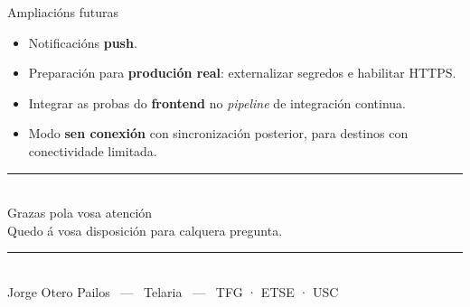 \documentclass[11pt,aspectratio=169]{beamer}
\begin{document}
\begin{frame}{Ampliacións futuras}
  \begin{itemize}
    \item Notificacións \textbf{push}.
    \item Preparación para \textbf{produción real}: externalizar segredos e habilitar HTTPS.
    \item Integrar as probas do \textbf{frontend} no \textit{pipeline} de integración continua.
    \item Modo \textbf{sen conexión} con sincronización posterior, para destinos con conectividade limitada.
  \end{itemize}
\end{frame}

\begin{frame}
  \vfill
  \begin{center}
    {\color{telPrimary}\rule{0.35\textwidth}{2pt}}\\[1.2em]
    {\color{telDeep} Grazas pola vosa atención}\\[1em]
    {\large\color{telInk} Quedo á vosa disposición para calquera pregunta.}\\[1.6em]
    {\color{telPrimary}\rule{0.35\textwidth}{2pt}}\\[1.4em]
    {\small\color{telGrey} Jorge Otero Pailos \ — \ Telaria \ — \ TFG · ETSE · USC}
  \end{center}
  \vfill
\end{frame}
\end{document}
